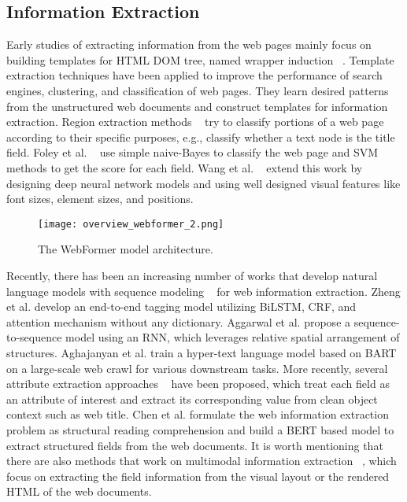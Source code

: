\documentclass[sigconf]{acmart}
\begin{document}
\subsection{Information Extraction}
Early studies of extracting information from the web pages mainly focus on building templates for HTML DOM tree, named wrapper induction ~\cite{CohenHJ02,KimS11}. Template extraction techniques have been applied to improve the performance of search engines, clustering, and classification of web pages. They learn desired patterns from the unstructured web documents and construct templates for information extraction. Region extraction methods ~\cite{ChangKGS06,SleimanC13} try to classify portions of a web page according to their specific purposes, e.g., classify whether a text node is the title field. Foley et al. ~\cite{FoleyBJ15} use simple naive-Bayes to classify the web page and SVM methods to get the score for each field. Wang et al. ~\cite{WangKGS19} extend this work by designing deep neural network models and using well designed visual features like font sizes, element sizes, and positions.
\begin{figure*}
\begin{center}
\texttt{[image: overview\_webformer\_2.png]}
\end{center}
\caption{The WebFormer model architecture.} \label{fig:overview}
\end{figure*}

Recently, there has been an increasing number of works that develop natural language models with sequence modeling ~\cite{HuangXY15,MaH16,abs-2101-09465,Lin0VT20,abs-2102-09550,abs-2101-02415} for web information extraction.
Zheng et al. \cite{ZhengMD018} develop an end-to-end tagging model utilizing BiLSTM, CRF, and attention mechanism without any dictionary.
Aggarwal et al. \cite{AggarwalGSK20} propose a sequence-to-sequence model using an RNN, which leverages relative spatial arrangement of structures. Aghajanyan et al. \cite{abs-2107-06955} train a hyper-text language model based on BART \cite{BART} on a large-scale web crawl for various downstream tasks.
More recently, several attribute extraction approaches ~\cite{XuWMJL19,WangYKSSSYE20,Amazon2} have been proposed, which treat each field as an attribute of interest and extract its corresponding value from clean object context such as web title.
Chen et al. \cite{abs-2101-09465} formulate the web information extraction problem as structural reading comprehension and build a BERT \cite{DevlinCLT19} based model to extract structured fields from the web documents.
It is worth mentioning that there are also methods that work on multimodal information extraction ~\cite{YangYAKKG17,XuWLZM21,WangSLHDJ21,WangWTJMDH21}, which focus on extracting the field information from the visual layout or the rendered HTML of the web documents.
\end{document}
